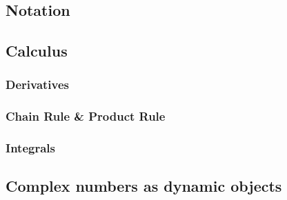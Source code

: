 \documentclass[10pt]{article}
\begin{document}
\subsection{Notation}

\subsection{Calculus}

\subsubsection{Derivatives}

\subsubsection{Chain Rule \& Product Rule}

\subsubsection{Integrals}

\subsection{Complex numbers as dynamic objects}
\end{document}

